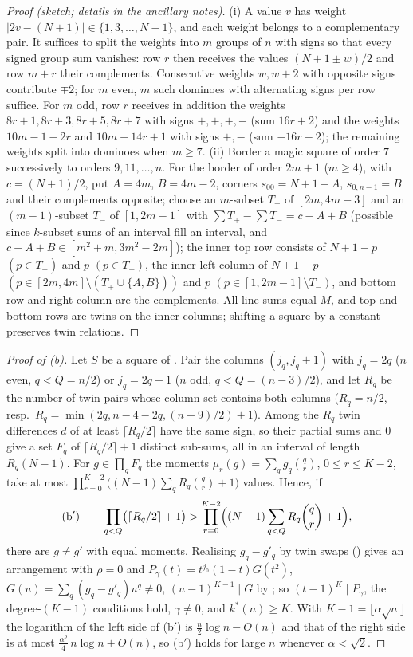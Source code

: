 \begin{proof}[Proof (sketch; details in the ancillary notes)]
(i) A value $v$ has weight $|2v-(N+1)|\in\{1,3,\dots,N-1\}$, and each weight belongs to a complementary pair.  It suffices to split
the weights into $m$ groups of $n$ with signs so that every signed group sum vanishes: row $r$ then receives the values
$(N+1\pm w)/2$ and row $m+r$ their complements.  Consecutive weights $w,w+2$ with opposite signs contribute $\mp2$; for $m$ even,
$m$ such dominoes with alternating signs per row suffice.  For $m$ odd, row $r$ receives in addition the weights
$8r+1,8r+3,8r+5,8r+7$ with signs $+,+,+,-$ (sum $16r+2$) and the weights $10m-1-2r$ and $10m+14r+1$ with signs $+,-$
(sum $-16r-2$); the remaining weights split into dominoes when $m\ge7$.
(ii) Border a magic square of order $7$ successively to orders $9,11,\dots,n$.  For the border of order $2m+1$ ($m\ge4$), with
$c=(N+1)/2$, put $A=4m$, $B=4m-2$, corners $s_{00}=N+1-A$, $s_{0,n-1}=B$ and their complements opposite; choose an $m$-subset $T_+$
of $[2m,4m-3]$ and an $(m-1)$-subset $T_-$ of $[1,2m-1]$ with $\sum T_+-\sum T_-=c-A+B$ (possible since $k$-subset sums of an interval
fill an interval, and $c-A+B\in[m^{2}+m,3m^{2}-2m]$); the inner top row consists of $N+1-p$ $(p\in T_+)$ and $p$ $(p\in T_-)$, the
inner left column of $N+1-p$ $(p\in[2m,4m]\setminus(T_+\cup\{A,B\}))$ and $p$ $(p\in[1,2m-1]\setminus T_-)$, and bottom row and right
column are the complements.  All line sums equal $M$, and top and bottom rows are twins on the inner columns; shifting a square
by a constant preserves twin relations.
\end{proof}

\begin{proof}[Proof of (b)]
Let $S$ be a square of .  Pair the columns $(j_q,j_q+1)$ with $j_q=2q$ ($n$ even, $q<Q=n/2$) or
$j_q=2q+1$ ($n$ odd, $q<Q=(n-3)/2$), and let $R_q$ be the number of twin pairs whose column set contains both columns
($R_q=n/2$, resp.\ $R_q=\min(2q,n-4-2q,(n-9)/2)+1$).  Among the $R_q$ twin differences $d$ of  at least
$\lceil R_q/2\rceil$ have the same sign, so their partial sums and $0$ give a set $F_q$ of $\lceil R_q/2\rceil+1$ distinct
sub-sums, all in an interval of length $R_q(N-1)$.  For $g\in\prod_qF_q$ the moments $\mu_r(g)=\sum_qg_q\binom qr$,
$0\le r\le K-2$, take at most $\prod_{r=0}^{K-2}\bigl((N-1)\sum_qR_q\binom qr+1\bigr)$ values.  Hence, if
\[
\text{(b$'$)}\qquad \prod_{q<Q}\bigl(\lceil R_q/2\rceil+1\bigr)>\prod_{r=0}^{K-2}\Bigl((N-1)\sum_{q<Q}R_q\binom qr+1\Bigr),
\]
there are $g\ne g'$ with equal moments.  Realising $g_q-g'_q$ by twin swaps () gives an arrangement with
$\rho=0$ and $P_\gamma(t)=t^{j_0}(1-t)G(t^{2})$, $G(u)=\sum_q(g_q-g'_q)u^{q}\ne0$, $(u-1)^{K-1}\mid G$ by ;
so $(t-1)^{K}\mid P_\gamma$, the degree-$(K-1)$ conditions hold, $\gamma\ne0$, and $k^{*}(n)\ge K$.  With $K-1=\lfloor\alpha\sqrt n\rfloor$
the logarithm of the left side of (b$'$) is $\frac n2\log n-O(n)$ and that of the right side is at most
$\frac{\alpha^{2}}4\,n\log n+O(n)$, so (b$'$) holds for large $n$ whenever $\alpha<\sqrt2$.
\end{proof}


